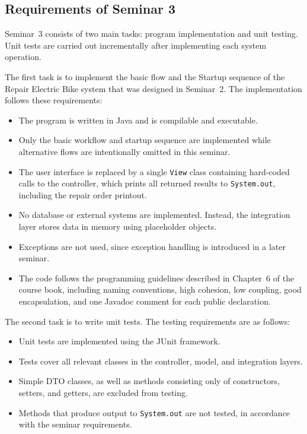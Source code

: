\documentclass[a4paper]{scrartcl}
\begin{document}
\subsection{Requirements of Seminar 3}

Seminar~3 consists of two main tasks: program implementation and unit testing. Unit tests are carried out incrementally after implementing each system operation.

The first task is to implement the basic flow and the Startup sequence of the Repair Electric Bike system that was designed in Seminar~2. The implementation follows these requirements:

\begin{itemize}
    \item The program is written in Java and is compilable and executable.
    \item Only the basic workflow and startup sequence are implemented while alternative flows are intentionally omitted in this seminar.
    \item The user interface is replaced by a single \texttt{View} class containing hard-coded calls to the controller, which prints all returned results to \texttt{System.out}, including the repair order printout.
    \item No database or external systems are implemented. Instead, the integration layer stores data in memory using placeholder objects.
    \item Exceptions are not used, since exception handling is introduced in a later seminar.
    \item The code follows the programming guidelines described in Chapter~6 of the course book, including naming conventions, high cohesion, low coupling, good encapsulation, and one Javadoc comment for each public declaration.
\end{itemize}

The second task is to write unit tests. The testing requirements are as follows:

\begin{itemize}
    \item Unit tests are implemented using the JUnit framework.
    \item Tests cover all relevant classes in the controller, model, and integration
          layers.
    \item Simple DTO classes, as well as methods consisting only of constructors,
          setters, and getters, are excluded from testing.
    \item Methods that produce output to \texttt{System.out} are not tested, in
          accordance with the seminar requirements.
\end{itemize}
\end{document}
